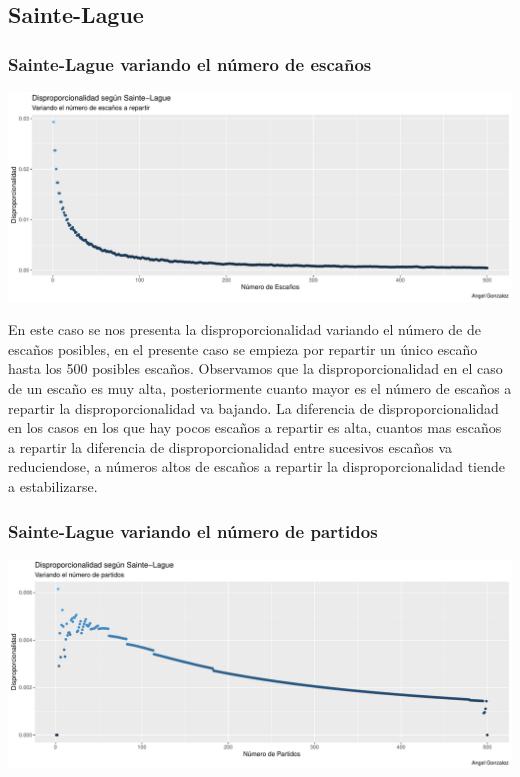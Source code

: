 \documentclass[12pt,a4paper,]{book}
\numberwithin{dummy}{section}
\theoremstyle{ocrenumbox}
\theoremstyle{blacknumex}
\theoremstyle{blacknumbox}
\theoremstyle{ocrenum}
\theoremstyle{ocrenum}
\begin{document}
\hypertarget{sainte-lague}{%
\subsection{Sainte-Lague}\label{sainte-lague}}

\hypertarget{sainte-lague-variando-el-nuxfamero-de-escauxf1os}{%
\subsubsection{Sainte-Lague variando el número de
escaños}\label{sainte-lague-variando-el-nuxfamero-de-escauxf1os}}

\begin{center}\includegraphics[width=0.95\linewidth]{figurasR/unnamed-chunk-14-1} \end{center}

En este caso se nos presenta la disproporcionalidad variando el número
de de escaños posibles, en el presente caso se empieza por repartir un
único escaño hasta los 500 posibles escaños. Observamos que la
disproporcionalidad en el caso de un escaño es muy alta, posteriormente
cuanto mayor es el número de escaños a repartir la disproporcionalidad
va bajando. La diferencia de disproporcionalidad en los casos en los que
hay pocos escaños a repartir es alta, cuantos mas escaños a repartir la
diferencia de disproporcionalidad entre sucesivos escaños va
reduciendose, a números altos de escaños a repartir la
disproporcionalidad tiende a estabilizarse.

\hypertarget{sainte-lague-variando-el-nuxfamero-de-partidos}{%
\subsubsection{Sainte-Lague variando el número de
partidos}\label{sainte-lague-variando-el-nuxfamero-de-partidos}}

\begin{center}\includegraphics[width=0.95\linewidth]{figurasR/unnamed-chunk-15-1} \end{center}
\end{document}
